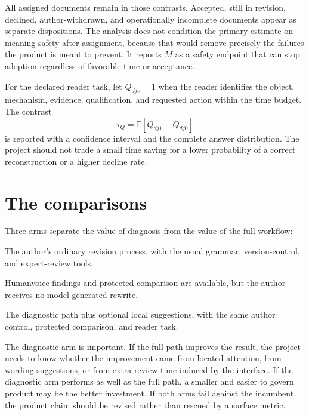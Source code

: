 All assigned documents remain in those contrasts. Accepted, still in revision,
declined, author-withdrawn, and operationally incomplete documents appear as
separate dispositions. The analysis does not condition the primary estimate on
meaning safety after assignment, because that would remove precisely the
failures the product is meant to prevent. It reports $M$ as a safety endpoint
that can stop adoption regardless of favorable time or acceptance.

For the declared reader task, let $Q_{djv}=1$ when the reader identifies the
object, mechanism, evidence, qualification, and requested action within the
time budget. The contrast
\begin{equation}
  \tau_Q=\mathbb E[Q_{dj1}-Q_{dj0}]
  \label{eq:eval-completion-estimand}
\end{equation}
is reported with a confidence interval and the complete answer distribution.
The project should not trade a small time saving for a lower probability of a
correct reconstruction or a higher decline rate.

\section{The comparisons}
\label{sec:eval-arms}

Three arms separate the value of diagnosis from the value of the full workflow:

\begin{description}[style=nextline,leftmargin=37mm,labelindent=0mm]
\item[Incumbent] The author's ordinary revision process, with the usual
grammar, version-control, and expert-review tools.
\item[Diagnostic path] Humanvoice findings and protected comparison are
available, but the author receives no model-generated rewrite.
\item[Full path] The diagnostic path plus optional local suggestions, with the
same author control, protected comparison, and reader task.
\end{description}

The diagnostic arm is important. If the full path improves the result, the
project needs to know whether the improvement came from located attention,
from wording suggestions, or from extra review time induced by the interface.
If the diagnostic arm performs as well as the full path, a smaller and easier
to govern product may be the better investment. If both arms fail against the
incumbent, the product claim should be revised rather than rescued by a
surface metric.

